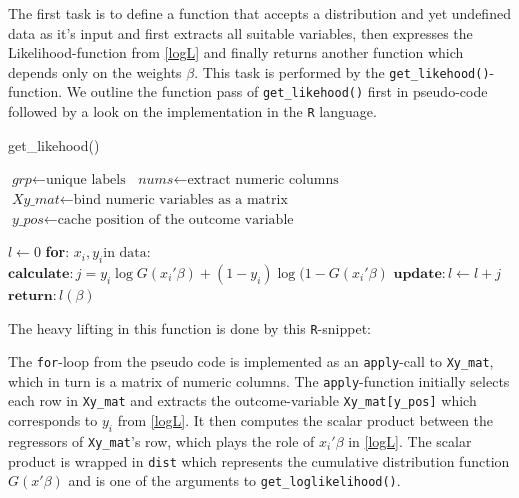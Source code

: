 \documentclass{article}
\begin{document}
The first task is to define a function that accepts a distribution and yet undefined data as it's input and first extracts all suitable variables, then expresses the Likelihood-function from \ref{logL} and finally returns another function which depends only on the weights $\beta$. This task is performed by the \texttt{get\_likehood()}-function. We outline the function pass of \texttt{get\_likehood()} first in pseudo-code followed by a look on the implementation in the \texttt{R} language.

\begin{algorithm}
\caption{get\_likehood()}\label{getllog}
\begin{algorithmic}[1]
\State $\textit{grp} \gets \text{unique labels}$
\State $\textit{nums} \gets \text{extract numeric columns}$
\State $\textit{Xy\_mat} \gets \text{bind numeric variables as a matrix}$
\State $\textit{y\_pos} \gets \text{cache position of the outcome variable}$
\EndProcedure

\State $\textit{l} \gets 0$
\State \textbf{for}: $x_i, y_i \text{in data}:$
\State \qquad $\textbf{calculate}: j = y_i \log G(x_i\prime \beta) +
               (1-y_i) \log (1-G(x_i\prime \beta)$
\State \qquad $\textbf{update}: l \gets l + j$
\State $\textbf{return}: l(\beta)$
\EndProcedure
\end{algorithmic}
\end{algorithm}

\newpage
The heavy lifting in this function is done by this \texttt{R}-snippet:


The \texttt{for}-loop from the pseudo code is implemented as an \texttt{apply}-call to \texttt{Xy\_mat}, which in turn is a matrix of numeric columns. The \texttt{apply}-function initially selects each row in \texttt{Xy\_mat} and extracts the outcome-variable \texttt{Xy\_mat[y\_pos]} which corresponds to $y_i$ from \ref{logL}. It then computes the scalar product between the regressors of \texttt{Xy\_mat}'s row, which plays the role of $x_i \prime \beta$ in \ref{logL}. The scalar product is wrapped in \texttt{dist} which represents the cumulative distribution function $G(x\prime\beta)$ and is one of the arguments to \texttt{get\_loglikelihood()}.


\end{document}
